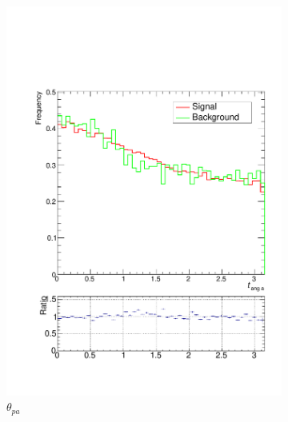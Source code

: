 \documentclass[10pt,a4paper]{book}
\begin{document}
\begin{figure}
\begin{subfigure}{.33\textwidth}
\includegraphics[scale=0.25]{reco/tang1}
\caption{$\theta_{pa}$}
\end{subfigure}
\begin{subfigure}{.33\textwidth}
\centering

\end{subfigure}
\end{figure}
\end{document}
